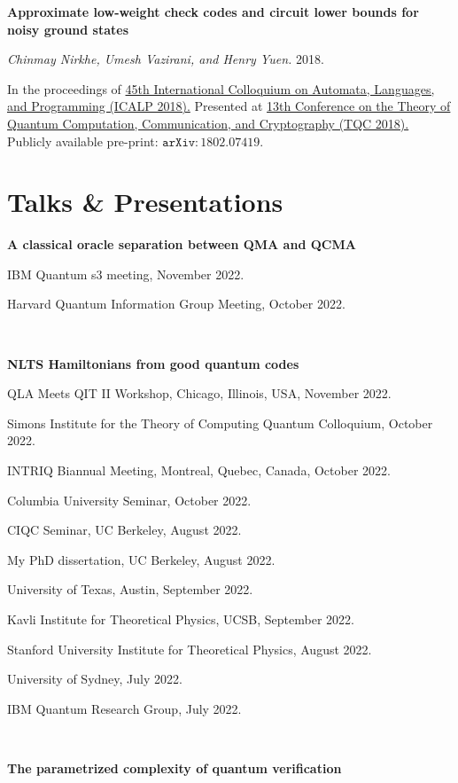 \documentclass[11pt]{article}
\begin{document}
\begin{enumerate}[{leftmargin=*,start=10,label=[\arabic*]\addtocounter{enumi}{-2}}]
\item \textbf{Approximate low-weight check codes and circuit lower bounds for noisy ground states}

\emph{Chinmay Nirkhe, Umesh Vazirani, and Henry Yuen.} 2018.

In the proceedings of \href{http://drops.dagstuhl.de/opus/volltexte/2018/9095/}{45th International Colloquium on Automata, Languages, and Programming (ICALP 2018).} 
Presented at \href{https://www.tqc2018.org/}{13th Conference on the Theory of Quantum Computation, Communication, and Cryptography (TQC 2018).}
Publicly available pre-print: \href{https://arxiv.org/abs/1802.07419}{$\mathtt{arXiv:1802.07419}$}.

\end{enumerate}


\section{Talks \& Presentations}

\textbf{A classical oracle separation between QMA and QCMA}

IBM Quantum s3 meeting, November 2022.

Harvard Quantum Information Group Meeting, October 2022.

\

\textbf{NLTS Hamiltonians from good quantum codes}

QLA Meets QIT II Workshop, Chicago, Illinois, USA, November 2022.

Simons Institute for the Theory of Computing Quantum Colloquium, October 2022.

INTRIQ Biannual Meeting, Montreal, Quebec, Canada, October 2022.

Columbia University Seminar, October 2022.

CIQC Seminar, UC Berkeley, August 2022.

My PhD dissertation, UC Berkeley, August 2022.

University of Texas, Austin, September 2022.

Kavli Institute for Theoretical Physics, UCSB, September 2022.

Stanford University Institute for Theoretical Physics, August 2022.

University of Sydney, July 2022.

IBM Quantum Research Group, July 2022.

\

\textbf{The parametrized complexity of quantum verification}
\end{document}
